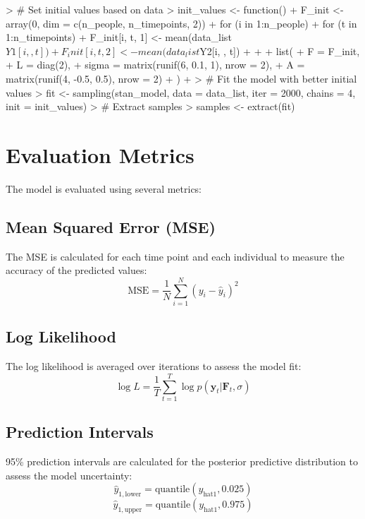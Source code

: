 \documentclass{article}
\begin{document}
\begin{Schunk}
\begin{Sinput}
> # Set initial values based on data
> init_values <- function() {
+   F_init <- array(0, dim = c(n_people, n_timepoints, 2))
+   for (i in 1:n_people) {
+     for (t in 1:n_timepoints) {
+       F_init[i, t, 1] <- mean(data_list$Y1[i, , t])
+       F_init[i, t, 2] <- mean(data_list$Y2[i, , t])
+     }
+   }
+   list(
+     F = F_init,
+     L = diag(2),
+     sigma = matrix(runif(6, 0.1, 1), nrow = 2),
+     A = matrix(runif(4, -0.5, 0.5), nrow = 2)
+   )
+ }
> # Fit the model with better initial values
> fit <- sampling(stan_model, data = data_list, iter = 2000, chains = 4, init = init_values)
> # Extract samples
> samples <- extract(fit)
\end{Sinput}
\end{Schunk}

\section{Evaluation Metrics}
The model is evaluated using several metrics:

\subsection{Mean Squared Error (MSE)}
The MSE is calculated for each time point and each individual to measure the accuracy of the predicted values:
\[
\text{MSE} = \frac{1}{N} \sum_{i=1}^{N} (y_i - \hat{y}_i)^2
\]

\subsection{Log Likelihood}
The log likelihood is averaged over iterations to assess the model fit:
\[
\log L = \frac{1}{T} \sum_{t=1}^{T} \log p(\bm{y}_t | \bm{F}_t, \sigma)
\]

\subsection{Prediction Intervals}
95\% prediction intervals are calculated for the posterior predictive distribution to assess the model uncertainty:
\[
\hat{y}_{1, \text{lower}} = \text{quantile}(y_{\text{hat1}}, 0.025)
\]
\[
\hat{y}_{1, \text{upper}} = \text{quantile}(y_{\text{hat1}}, 0.975)
\]
\end{document}
